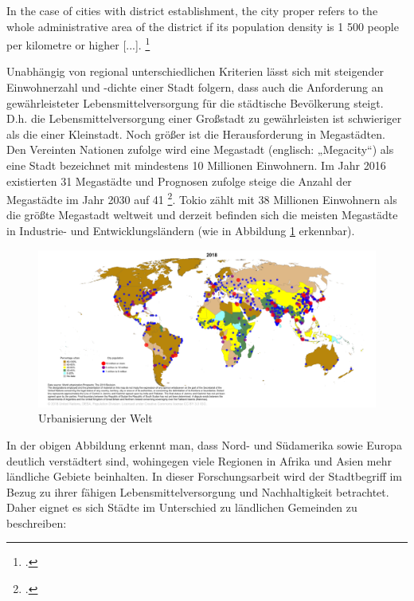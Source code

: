 \documentclass{article}
\begin{document}
\begin{displayquote}
In the case of cities with district establishment, the city proper refers to the whole administrative area of the district if its population density is 1 500 people per kilometre or higher [...]. \footcite[S.~2]{UnitedNations2005Table2005} 
\end{displayquote}

Unabhängig von regional unterschiedlichen Kriterien lässt sich mit steigender Einwohnerzahl und -dichte einer Stadt folgern, dass auch die Anforderung an gewährleisteter Lebensmittelversorgung für die städtische Bevölkerung steigt. D.h. die Lebensmittelversorgung einer Großstadt zu gewährleisten ist schwieriger als die einer Kleinstadt. Noch größer ist die Herausforderung in Megastädten. Den Vereinten Nationen zufolge wird eine Megastadt (englisch: „Megacity“) als eine Stadt bezeichnet mit mindestens 10 Millionen Einwohnern. Im Jahr 2016 existierten 31 Megastädte und Prognosen zufolge steige die Anzahl der Megastädte im Jahr 2030 auf 41 \footcite{UnitedNations2016The2016}. Tokio zählt mit 38 Millionen Einwohnern als die größte Megastadt weltweit und derzeit befinden sich die meisten Megastädte in Industrie- und Entwicklungsländern (wie in Abbildung \ref{figUrban} erkennbar). 

\begin{figure}[h]
\centering
\hspace*{-4cm}   
\includegraphics[width=20cm]{image_folder/CityPop_Urban.png}
\caption{Urbanisierung der Welt}
\label{figUrban}
\end{figure}

In der obigen Abbildung erkennt man, dass Nord- und Südamerika sowie Europa deutlich verstädtert sind, wohingegen viele Regionen in Afrika und Asien mehr ländliche Gebiete beinhalten. In dieser Forschungsarbeit wird der Stadtbegriff im Bezug zu ihrer fähigen Lebensmittelversorgung und Nachhaltigkeit betrachtet. Daher eignet es sich Städte im Unterschied zu ländlichen Gemeinden zu beschreiben: 
\end{document}

